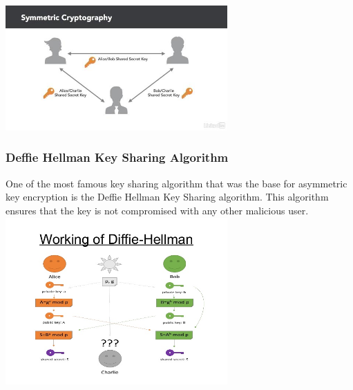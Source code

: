 \documentclass[conference]{IEEEtran}
\begin{document}
\includegraphics[width=8.5cm]{symmetric}

\subsubsection{Deffie Hellman Key Sharing Algorithm}
One of the most famous key sharing algorithm that was the base for asymmetric key encryption is the Deffie Hellman Key Sharing algorithm. This algorithm ensures that the key is not compromised with any other malicious user.
\linebreak
\includegraphics[width=8.5cm]{hellman}
\end{document}
